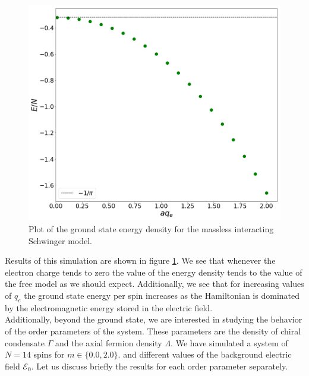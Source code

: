 \begin{figure}[h]
	\centering
	\includegraphics[scale=0.25]{figures/InteractingGsMassless}
	\caption{Plot of the ground state energy density for the massless interacting Schwinger model.}
	\label{fig:interactinggsmassless}
\end{figure}
Results of this simulation are shown in figure \ref{fig:interactinggsmassless}. We see that whenever the electron charge tends to zero the value of the energy density tends to the value of the free model as we should expect. Additionally, we see that for increasing values of $q_e$ the ground state energy per spin increases as the Hamiltonian is dominated by the electromagnetic energy stored in the electric field.\\

Additionally, beyond the ground state, we are interested in studying the behavior of the order parameters of the system. These parameters are the density of chiral condensate $\Gamma$ and the axial fermion density $\Lambda$. We have simulated a system of $N=14$ spins for $m\in\{0.0,2.0\}.$ and different values of the background electric field $\mathcal{E}_0$. Let us discuss briefly the results for each order parameter separately.\\

